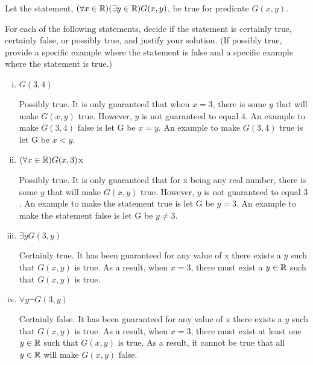 \documentclass[11pt]{article}
\begin{document}
\begin{Parts}
	
	\Part Let the statement, $(\forall x \in \mathbb{R})(\exists y \in \mathbb{R}) G(x, y)$, be true for 
	predicate $G(x, y)$.

	For each of the following statements, decide if the statement is certainly true, certainly 
	false, or possibly true, and justify your solution. (If possibly true, provide a specific 
	example where the statement is false and a specific example where the statement is true.)

	\begin{enumerate}[(i)]
		\item $G(3,4)$ 
		
		\begin{Answer}
			Possibly true. It is only guaranteed that when $x=3$, there is some 
			$y$ that will make $G(x,y)$ true. However, $y$ is not guaranteed to equal $4$. An
			example to make $G(3,4)$ false is let G be $x=y$. An example to make $G(3,4)$ true
			is let G be $x<y$. 
		\end{Answer}

		\item $(\forall x \in \mathbb{R}) G(x,3)$x
		
		\begin{Answer}
			Possibly true. It is only guaranteed that for x being any real number, there is 
			some $y$ that will make $G(x,y)$ true. However, $y$ is not guaranteed to equal $3$. 
			An example to make the statement true is let G be $y=3$. An example to make the 
			statement false is let G be $y \neq 3$.
		\end{Answer}

		\item $\exists y G(3,y)$
		
		\begin{Answer}
			Certainly true. It has been guaranteed for any value of x there exists a $y$ such 
			that $G(x,y)$ is true. As a result, when $x=3$, there must exist a $y \in \mathbb{R}$ such 
			that $G(x,y)$ is true.
		\end{Answer}

		\item $\forall y \neg G(3,y)$
		
		\begin{Answer}
			Certainly false. It has been guaranteed for any value of x there exists a $y$ such
			that $G(x,y)$ is true. As a result, when $x=3$, there must exist at least one 
			$y \in \mathbb{R}$ such that $G(x,y)$ is true. As a result, it cannot be true that all 
			$y \in \mathbb{R}$ will make $G(x,y)$ false. 
		\end{Answer}


\end{enumerate}
\end{Parts}
\end{document}
